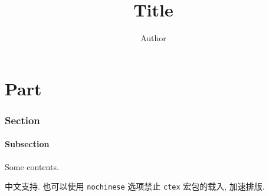 \documentclass[english]{note}
\title{Title}
\author{Author}
\begin{document}
	\maketitle

	\tableofcontents





\part{Part}

\section{Section}

\subsection{Subsection}

Some contents. \parencite{Bibtexkey}

中文支持. 也可以使用 \verb"nochinese" 选项禁止 \verb"ctex" 宏包的载入, 加速排版.

	\printbibliography[heading=bibintoc]
\end{document}
